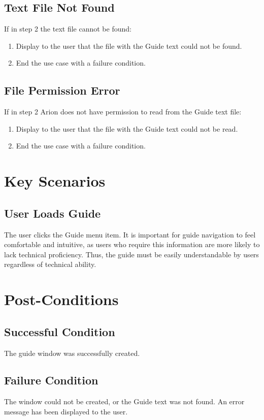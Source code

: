 \documentclass{scrreprt}
\begin{document}
    \subsection{Text File Not Found}
    If in step 2 the text file cannot be found:
    \begin{enumerate}
        \item Display to the user that the file with the Guide text could not be found.
        \item End the use case with a failure condition.
    \end{enumerate}

    \subsection{File Permission Error}
    If in step 2 Arion does not have permission to read from the Guide text file:
    \begin{enumerate}
        \item Display to the user that the file with the Guide text could not be read.
        \item End the use case with a failure condition.
    \end{enumerate}

\section{Key Scenarios}
    \subsection{User Loads Guide}
    The user clicks the Guide menu item.
    It is important for guide navigation to feel comfortable and intuitive,
    as users who require this information are more likely to lack technical proficiency.
    Thus, the guide must be easily understandable by users regardless of technical ability.

\section{Post-Conditions}
    \subsection{Successful Condition}
    The guide window was successfully created.
    
    \subsection{Failure Condition}
    The window could not be created, or the Guide text was not found.
    An error message has been displayed to the user.
\end{document}

